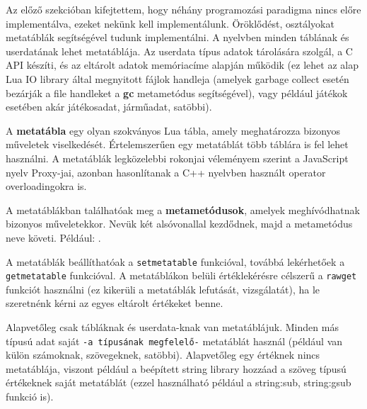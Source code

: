 \pagebreak

Az előző szekcióban kifejtettem, hogy néhány programozási paradigma nincs előre implementálva, ezeket nekünk kell implementálunk. Öröklődést, osztályokat metatáblák segítségével tudunk implementálni.
A nyelvben minden táblának és userdatának lehet metatáblája. Az userdata típus adatok tárolására szolgál, a C API készíti, és az eltárolt adatok memóriacíme alapján működik (ez lehet az alap Lua IO library által megnyitott fájlok handleja (amelyek garbage collect esetén bezárják a file handleket a \detokenize{__}\textbf{gc} metametódus segítségével), vagy például játékok esetében akár játékosadat, járműadat, satöbbi).

A \textbf{metatábla} egy olyan szokványos Lua tábla, amely meghatározza bizonyos műveletek viselkedését. Értelemszerűen egy metatáblát több táblára is fel lehet használni. A metatáblák legközelebbi rokonjai véleményem szerint a JavaScript nyelv Proxy-jai, azonban hasonlítanak a C++ nyelvben használt operator overloadingokra is. 

A metatáblákban találhatóak meg a \textbf{metametódusok}, amelyek meghívódhatnak bizonyos műveletekkor. Nevük két alsóvonallal kezdődnek, majd a metametódus neve követi. Például: \texttt{}.

A metatáblák beállíthatóak a \texttt{setmetatable} funkcióval, továbbá lekérhetőek a \texttt{getmetatable} funkcióval. A metatáblákon belüli értéklekérésre célszerű a \texttt{rawget} funkciót használni (ez kikerüli a metatáblák lefutását, vizsgálatát), ha le szeretnénk kérni az egyes eltárolt értékeket benne.

Alapvetőleg csak tábláknak és userdata-knak van metatáblájuk. Minden más típusú adat saját \texttt{-a típusának megfelelő-} metatáblát használ (például van külön számoknak, szövegeknek, satöbbi). Alapvetőleg egy értéknek nincs metatáblája, viszont például a beépített string library hozzáad a szöveg típusú értékeknek saját metatáblát (ezzel használható például a string:sub, string:gsub funkció is).

